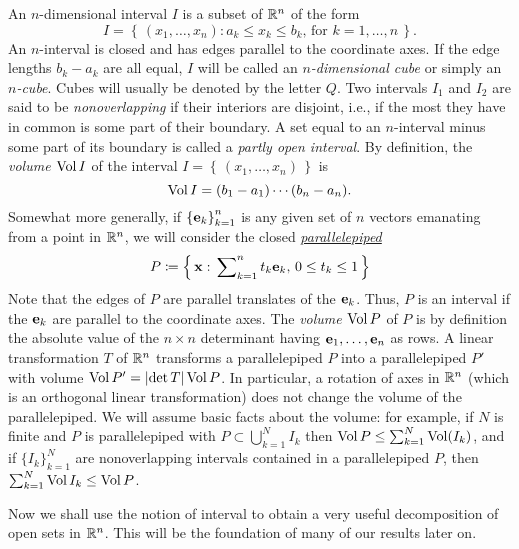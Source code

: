 An $n$-dimensional interval $I$ is a subset of $\mathbb{R}^n$ of the form
\begin{equation}
\label{eq:1:n-interval}
I=\left\{\,(x_1,\dotsc,x_n):\text{$a_k\leq x_k\leq b_k$, for $k=1,\dotsc,n$}\,\right\}.
\end{equation}
An $n$-interval is closed and has edges parallel to the coordinate axes. If
the edge lengths $b_k-a_k$ are all equal, $I$ will be called an
\emph{$n$-dimensional cube} or simply an \emph{$n$-cube}. Cubes will
usually be denoted by the letter $Q$. Two intervals $I_1$ and $I_2$ are
said to be \emph{nonoverlapping} if their interiors are disjoint, i.e., if
the most they have in common is some part of their boundary. A set equal to
an $n$-interval minus some part of its boundary is called a \emph{partly
  open interval}. By definition, the \emph{volume $\operatorname{Vol} I$} of the interval
$I=\left\{\,(x_1,\dotsc,x_n)\,\right\}$ is
\begin{equation}
  \label{eq:1:volume-of-n-interval}
\operatorname{Vol} I=(b_1-a_1)\dotsm(b_n-a_n).
\end{equation}
Somewhat more generally, if ${\{\mathbf{e}_k\}}_{k=1}^n$ is any given set of $n$
vectors emanating from a point in $\mathbb{R}^n$, we will consider the closed
\href{https://en.wikipedia.org/wiki/Parallelepiped}{\emph{parallelepiped}}
\begin{equation}
  \label{eq:1:parallelepiped}
P\coloneqq\left\{\,\mathbf{x}:\text{$\sideset{}{_{k=1}^n}\sum t_k\mathbf{e}_k$, $0\leq
    t_k\leq 1$}\,\right\}
\end{equation}
Note that the edges of $P$ are parallel translates of the $\mathbf{e}_k$. Thus,
$P$ is an interval if the $\mathbf{e}_k$ are parallel to the coordinate axes. The
\emph{volume $\operatorname{Vol} P$} of $P$ is by definition the absolute value of the
$n\times n$ determinant having $\mathbf{e}_1,\dotsc,\mathbf{e}_n$ as rows. A linear
transformation $T$ of $\mathbb{R}^n$ transforms a parallelepiped $P$ into a
parallelepiped $P'$ with volume $\operatorname{Vol} P'=|{\det T}|\operatorname{Vol} P$. In particular,
a rotation of axes in $\mathbb{R}^n$ (which is an orthogonal linear
transformation) does not change the volume of the parallelepiped. We will
assume basic facts about the volume: for example, if $N$ is finite and $P$
is parallelepiped with $P\subset\bigcup_{k=1}^N I_k$ then $\operatorname{Vol}
P\leq\sum_{k=1}^N\operatorname{Vol}(I_k)$, and if ${\{I_k\}}_{k=1}^N$ are nonoverlapping
intervals contained in a parallelepiped $P$, then $\sum_{k=1}^N\operatorname{Vol}
I_k\leq\operatorname{Vol} P$.

Now we shall use the notion of interval to obtain a very useful
decomposition of open sets in $\mathbb{R}^n$. This will be the foundation of many
of our results later on.

